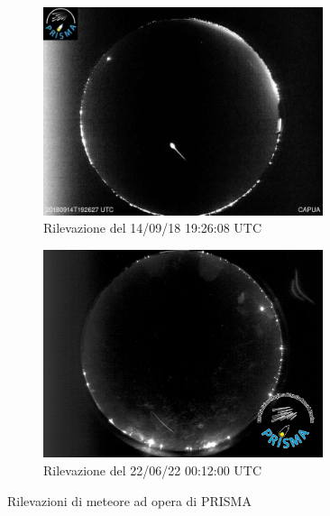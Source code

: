 \begin{figure}[b]

\begin{subfigure}{\textwidth}
\begin{center}
\includegraphics[width=0.9\textwidth]{images/CAPUA_20180914.jpg}
\caption{Rilevazione del 14/09/18 19:26:08 UTC}
\end{center}
\end{subfigure}

\vspace{12pt}

\begin{subfigure}{\textwidth}
\begin{center}
\includegraphics[width=0.9\textwidth]{images/CODOGNO_22062022.png}
\caption{Rilevazione del 22/06/22 00:12:00 UTC}
\label{fig:codogno-2206}
\end{center}
\end{subfigure}

\caption{Rilevazioni di meteore ad opera di PRISMA}
\end{figure}